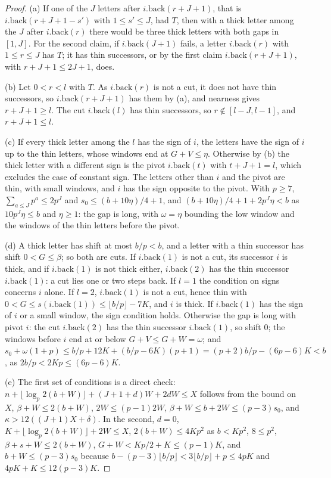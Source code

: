 \begin{proof}
(a) If one of the $J$ letters after $i.\mathrm{back}(r+J+1)$, that is $i.\mathrm{back}(r+J+1-s')$ with $1\le s'\le J$, had $T$, then with a thick letter among the $J$ after $i.\mathrm{back}(r)$ there would be three thick letters with both gaps in $[1,J]$. For the second claim, if $i.\mathrm{back}(J+1)$ fails, a letter
$i.\mathrm{back}(r)$ with $1\le r\le J$ has $T$; it has thin successors, or by the first claim $i.\mathrm{back}(r+J+1)$, with $r+J+1\le2J+1$, does.

(b) Let $0<r<l$ with $T$. As $i.\mathrm{back}(r)$ is not a cut, it does not have thin successors, so $i.\mathrm{back}(r+J+1)$ has them by (a), and nearness gives $r+J+1\ge l$. The cut $i.\mathrm{back}(l)$ has thin successors, so $r\notin[l-J,l-1]$, and $r+J+1\le l$.

(c) If every thick letter among the $l$ has the sign of $i$, the letters have the sign of $i$ up to the thin letters, whose windows end at $G+V\le\eta$. Otherwise by (b) the thick letter with a different sign is the pivot $i.\mathrm{back}(t)$ with $t+J+1=l$, which excludes the case of constant sign. The letters other than $i$ and the pivot
are thin, with small windows, and $i$ has the sign opposite to the pivot. With $p\ge7$, $\sum_{a\le J}p^a\le2p^J$ and $s_0\le(b+10\eta)/4+1$, and $(b+10\eta)/4+1+2p^J\eta<b$ as $10p^J\eta\le b$ and $\eta\ge1$: the gap is long, with $\omega=\eta$ bounding the low window and the windows of the thin letters before the
pivot.

(d) A thick letter has shift at most $b/p<b$, and a letter with a thin successor has shift $0<G\le\beta$; so both are cuts. If $i.\mathrm{back}(1)$ is not a cut, its successor $i$ is thick, and if $i.\mathrm{back}(1)$ is not thick either, $i.\mathrm{back}(2)$ has the thin successor $i.\mathrm{back}(1)$: a cut lies one or two steps back. If
$l=1$ the condition on signs concerns $i$ alone. If $l=2$, $i.\mathrm{back}(1)$ is not a cut, hence thin with $0<G\le s(i.\mathrm{back}(1))\le\lfloor b/p\rfloor-7K$, and $i$ is thick. If $i.\mathrm{back}(1)$ has the sign of $i$ or a small window, the sign condition holds. Otherwise the gap is long with pivot $i$: the cut $i.\mathrm{back}(2)$ has
the thin successor $i.\mathrm{back}(1)$, so shift $0$; the windows before $i$ end at or below $G+V\le G+W=\omega$; and $s_0+\omega(1+p)\le b/p+12K+(b/p-6K)(p+1)=(p+2)b/p-(6p-6)K<b$, as $2b/p<2Kp\le(6p-6)K$.

(e) The first set of conditions is a direct check: $n+\lfloor\log_p2(b+W)\rfloor+(J+1+d)W+2dW\le X$ follows from the bound on $X$, $\beta+W\le2(b+W)$, $2W\le(p-1)2W$, $\beta+W\le b+2W\le(p-3)s_0$, and $\kappa>12((J+1)X+\delta)$. In the second, $d=0$, $K+\lfloor\log_p2(b+W)\rfloor+2W\le X$, $2(b+W)\le4Kp^2$ as $b<Kp^2$, $8\le p^2$,
$\beta+s+W\le2(b+W)$, $G+W<Kp/2+K\le(p-1)K$, and $b+W\le(p-3)s_0$ because $b-(p-3)\lfloor b/p\rfloor<3\lfloor b/p\rfloor+p\le4pK$ and $4pK+K\le12(p-3)K$.
\end{proof}

